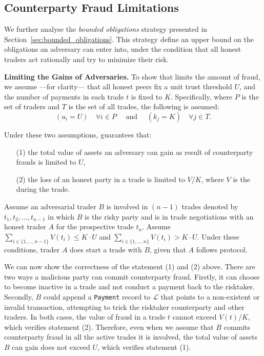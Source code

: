 \subsection{Counterparty Fraud Limitations}
We further analyse the \emph{bounded obligations} strategy presented in Section~\ref{sec:bounded_obligations}.
This strategy define an upper bound on the obligations an adversary can enter into, under the condition that all honest traders act rationally and try to minimize their risk.

\textbf{Limiting the Gains of Adversaries.} 
To show that \ModelName{} limits the amount of fraud, we assume  ---for clarity--- that all honest peers fix a unit trust threshold $ U $, and the number of payments in each trade $ t $ is fixed to $ K $. 
Specifically, where $ P $ is the set of traders and $ T $ is the set of all trades, the following is assumed:
\begin{equation*}
	(u_i = U) \quad\forall i\in P \quad\text{ and }\quad (k_j = K) \quad\forall j \in T.
\end{equation*}

Under these two assumptions, \ModelName{} guarantees that:

\begin{itemize}
	\item[(1)] the total value of assets an adversary can gain as result of counterparty frauds is limited to $ U $,
	\item[(2)] the loss of an honest party in a trade is limited to $ V/K $, where $ V $ is the \MarginalStake{} during the trade.
\end{itemize}

Assume an adversarial trader $ B $ is involved in $ (n-1) $ trades denoted by $ t_1, t_2, \ldots, t_{n-1} $ in which $ B $ is the risky party and is in trade negotiations with an honest trader $ A $ for the prospective trade $ t_n $.
Assume $\sum_{i \in \{1, \ldots, n-1\}} V(t_i) \leq K\cdotp U$ and $\sum_{i \in \{1, \ldots, n\}} V(t_i) > K\cdotp U$.
Under these conditions, trader $ A $ does start a trade with $ B $, given that $ A $ follows \ModelName{} protocol.

We can now show the correctness of the statement (1) and (2) above.
There are two ways a malicious party can commit counterparty fraud.
Firstly, it can choose to become inactive in a trade and not conduct a payment back to the risktaker.
Secondly, $ B $ could append a \texttt{Payment} record to $ \mathcal{L} $ that points to a non-existent or invalid transaction, attempting to trick the risktaker counterparty and other traders.
In both cases, the value of fraud in a trade $ t $ cannot exceed $ V(t)/K $, which verifies statement (2).
Therefore, even when we assume that $ B $ commits counterparty fraud in all the active trades it is involved, the total value of assets $ B $ can gain does not exceed $ U $, which verifies statement (1). 

